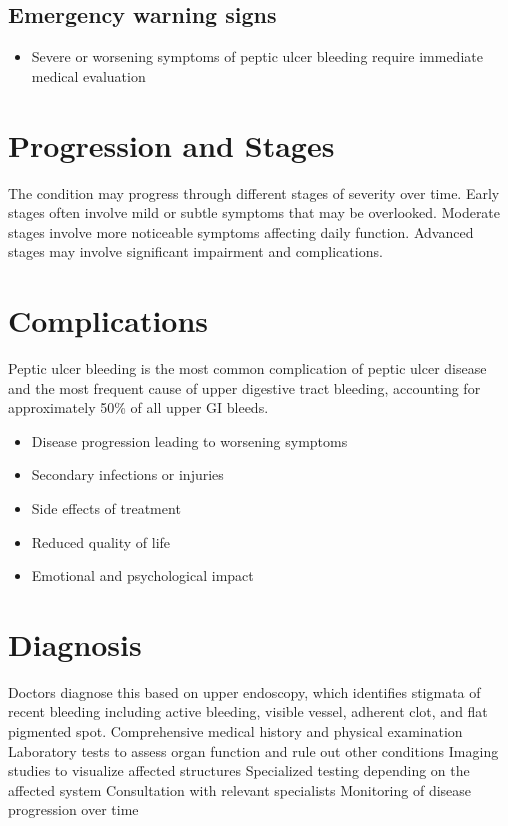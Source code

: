 \subsection{Emergency warning signs}
\begin{itemize}[noitemsep]
  \item Severe or worsening symptoms of peptic ulcer bleeding require immediate medical evaluation
\end{itemize}
\section{Progression and Stages}
The condition may progress through different stages of severity over time. Early stages often involve mild or subtle symptoms that may be overlooked. Moderate stages involve more noticeable symptoms affecting daily function. Advanced stages may involve significant impairment and complications.
\section{Complications}
Peptic ulcer bleeding is the most common complication of peptic ulcer disease and the most frequent cause of upper digestive tract bleeding, accounting for approximately 50\% of all upper GI bleeds.

\begin{itemize}[noitemsep]
  \item Disease progression leading to worsening symptoms
  \item Secondary infections or injuries
  \item Side effects of treatment
  \item Reduced quality of life
  \item Emotional and psychological impact
\end{itemize}
\section{Diagnosis}
Doctors diagnose this based on upper endoscopy, which identifies stigmata of recent bleeding including active bleeding, visible vessel, adherent clot, and flat pigmented spot. Comprehensive medical history and physical examination Laboratory tests to assess organ function and rule out other conditions Imaging studies to visualize affected structures Specialized testing depending on the affected system Consultation with relevant specialists Monitoring of disease progression over time

